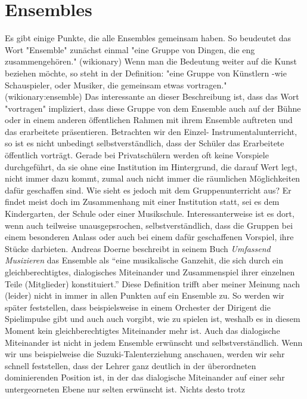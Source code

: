 \section{Ensembles}

Es gibt einige Punkte, die alle Ensembles gemeinsam haben. So beudeutet das Wort
"Ensemble" zunächst einmal "eine Gruppe von Dingen, die eng
zusammengehören." (wikionary) Wenn man die Bedeutung weiter auf die Kunst
beziehen möchte, so steht in der Definition: "eine Gruppe von Künstlern -wie
Schauspieler, oder Musiker, die gemeinsam etwas vortragen."
(wikionary:ensemble) Das interessante an dieser Beschreibung ist, dass das Wort
"vortragen" impliziert, dass diese Gruppe von dem Ensemble auch auf der Bühne
oder in einem anderen öffentlichen Rahmen mit ihrem Ensemble auftreten und das
erarbeitete präsentieren. Betrachten wir den Einzel- Instrumentalunterricht, so
ist es nicht unbedingt selbstverständlich, dass der Schüler das Erarbeitete
öffentlich vorträgt. Gerade bei Privatschülern werden oft keine Vorspiele
durchgeführt, da sie ohne eine Institution im Hintergrund, die darauf Wert legt,
nicht immer dazu kommt, zumal auch nicht immer die räumlichen Möglichkeiten dafür
geschaffen sind. Wie sieht es jedoch mit dem Gruppenunterricht aus? Er findet
meist doch im Zusammenhang mit einer Institution statt, sei es dem Kindergarten, der
Schule oder einer Musikschule. Interessanterweise ist es dort, wenn auch
teilweise unausgepsrochen, selbstverständlich, dass die Gruppen bei einem
besonderen Anlass oder auch bei einem dafür geschaffenen Vorspiel, ihre Stücke
darbieten. 
Andreas Doerne beschreibt in seinem Buch \emph{Umfassend Musizieren} das Ensemble als
\enquote{eine musikalische Ganzehit, die sich
durch ein gleichberechtigtes, dialogisches Miteinander und Zusammenspiel ihrer
einzelnen Teile (Mitglieder) konstituiert.}
\autocite[62]{doerne:umfassend_musizieren} Diese Definition trifft aber meiner
Meinung nach (leider) nicht in immer in allen Punkten auf ein Ensemble zu. So
werden wir später feststellen, dass beispielsweise in einem Orchester der
Dirigent die Spielimpulse gibt und auch auch vorgibt, wie zu spielen ist,
weshalb es in diesem Moment kein gleichberechtigtes Miteinander mehr ist. Auch
das dialogische Miteinander ist nicht in jedem Ensemble erwünscht und
selbstverständlich. Wenn wir uns beispielweise die Suzuki-Talenterziehung
anschauen, werden wir sehr schnell feststellen, dass der Lehrer ganz deutlich in
der überordneten dominierenden Position ist, in der das dialogische Miteinander
auf einer sehr untergeorneten Ebene nur selten erwünscht ist. Nichts desto trotz
